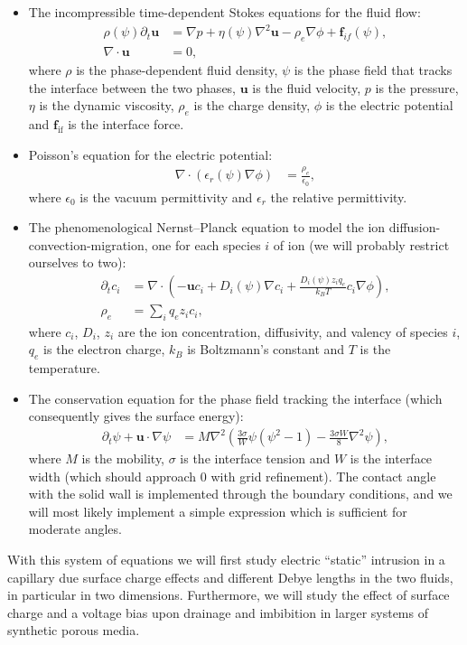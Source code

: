 \documentclass[a4paper,10pt]{article}
\numberwithin{equation}{section}
\numberwithin{figure}{section}
\renewcommand{\v}[1]{\mathbf{#1}}
\newcommand{\intf}{\textrm{if}}
\begin{document}
\begin{itemize} 
\item The incompressible time-dependent Stokes equations for the fluid flow:
  \begin{align}
    \rho(\psi) \partial_t \mathbf{u}  &= \nabla p +\eta(\psi) \nabla^2 \mathbf{u} -  \rho_e  \nabla \phi + \mathbf{f}_{if}(\psi),  \\  
    \nabla \cdot\mathbf{u} &= 0,
  \end{align}
  where $\rho$ is the phase-dependent fluid density, $\psi$ is the phase field that tracks the interface between the two phases, $\v u$ is the fluid velocity, $p$ is the pressure, $\eta$ is the dynamic viscosity, $\rho_e$ is the charge density, $\phi$ is the electric potential and $\v f_{\intf}$ is the interface force.
\item Poisson's equation for the electric potential: 
  \begin{align}
    \nabla\cdot\left(\epsilon_r(\psi)\nabla\phi\right) &= \frac{\rho_e}{\epsilon_0 },
  \end{align}
  where $\epsilon_0$ is the vacuum permittivity and $\epsilon_r$ the relative permittivity.
\item The phenomenological Nernst--Planck equation to model the ion diffusion-convection-migration, one for each species $i$ of ion (we will probably restrict ourselves to two):
  \begin{align}
    \partial_t c_i  &=  \nabla  \cdot  \left( - \mathbf{u} c_i  + D_i(\psi) \nabla c_i  +   \frac{D_i(\psi) z_i q_e}{k_B T} c_i \nabla \phi \right), \\
\rho_e &= \sum_i q_e z_i c_i, 
  \end{align}
  where $c_i$, $D_i$, $z_i$ are the ion concentration, diffusivity, and valency of species $i$, $q_e$ is the electron charge, $k_B$ is Boltzmann's constant and $T$ is the temperature.
\item The conservation equation for the phase field tracking the interface (which consequently gives the surface energy):
  \begin{align}
    \partial_t \psi + \mathbf{u}\cdot\nabla\psi &= M\nabla^2\left(\frac{3 \sigma }{W} \psi \left(\psi^2 -1\right) - \frac{3 \sigma W}{8}\nabla^2 \psi\right),
  \end{align}
  where $M$ is the mobility, $\sigma$ is the interface tension and $W$ is the interface width (which should approach 0 with grid refinement).
  The contact angle with the solid wall is implemented through the boundary conditions, and we will most likely implement a simple expression which is sufficient for moderate angles.
\end{itemize}
With this system of equations we will first study electric ``static'' intrusion in a capillary due surface charge effects and different Debye lengths in the two fluids, in particular in two dimensions.
Furthermore, we will study the effect of surface charge and a voltage bias upon drainage and imbibition in larger systems of synthetic porous media.
\end{document}
